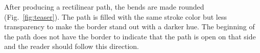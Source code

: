 After producing a rectilinear path, the bends are made rounded (Fig.~\ref{fig:teaser}). The path is filled with the same stroke color but less transparency to make the border stand out with a darker hue. The beginning of the path does not have the border to indicate that the path is open on that side and the reader should follow this direction. 
